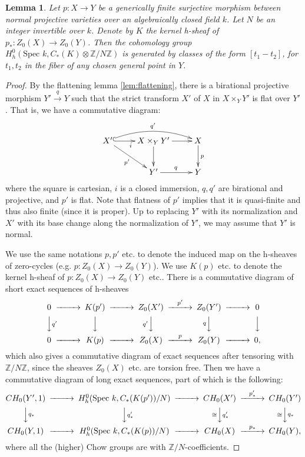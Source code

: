 \documentclass{amsart}
\newtheorem{lem}[theorem]{Lemma}
\theoremstyle{definition}
\theoremstyle{remark}
\newcommand{\mbb}{\mathbb}
\newcommand{\ZZ}{\mbb{Z}}
\newcommand{\SP}{\text{Spec }}
\begin{document}
\begin{lem}\label{lem:move}
Let $p: X \to Y$ be a generically finite surjective morphism between normal projective varieties over an algebraically closed field $k$.
 Let $N$ be an integer invertible over $k$.
Denote by $K$ the kernel h-sheaf of $p_*: Z_0(X) \to Z_0(Y)$.
Then the cohomology group $H_h^{0}(\SP k, C_*(K)\otimes \ZZ/N\ZZ)$ is generated by classes of the form $[t_1-t_2]$, for $t_1, t_2$ in the fiber of any chosen general point in $Y$.
\end{lem}
\begin{proof}
By the flattening lemma \ref{lem:flattening}, there is a birational projective  morphism $Y' \xrightarrow{q} Y$ such that the strict transform $X'$ of $X$ in $X \times_Y Y'$ is flat over $Y'$. That is, we have a commutative diagram:
\[
\xymatrix{
X' \ar[rd]_{p'} \ar@{^{(}->}[r]_i \ar@/^1pc/[rr]^{q'}
&X\times_Y Y' \ar[d]\ar[r]
&X \ar[d]^p\\
&Y' \ar[r]^q &Y
}
\]
where the square is cartesian, $i$ is a closed immersion, $q, q'$ are birational and projective, and $p'$ is flat.
Note that flatness of $p'$ implies that it is quasi-finite and thus also finite (since it is proper).
Up to replacing $Y'$ with its normalization and $X'$ with its base change along the normalization of $Y'$, we may assume that $Y'$ is normal.

We use the same notations $p, p'$ etc. to denote the induced map on the h-sheaves of zero-cycles (e.g. $p:Z_0(X) \to Z_0(Y)$).
We use $K(p)$ etc. to denote the kernel h-sheaf of $p: Z_0(X) \to Z_0(Y)$ etc.. 
There is a commutative diagram of short exact sequences of h-sheaves
\[
\begin{CD}
0 @>>> K(p') @>>> Z_0(X') @>p'>> Z_0(Y') @>>> 0\\
@VVq'V @VVV @Vq'VV @VqVV @VVV\\
0 @>>> K(p) @>>> Z_0(X) @>p>> Z_0(Y) @>>> 0,
\end{CD}
\]
which also gives a commutative diagram of exact sequences after tensoring with $\ZZ/N\ZZ$, since the sheaves $Z_0(X)$ etc. are torsion free.
Then we have a commutative diagram of long exact sequences, part of which is the following:
\[
\begin{CD}
     CH_0(Y', 1) @>>> H_h^{0}(\SP k, C_*(K(p'))/N)
    @>>> CH_0(X')  @>p_*'>> CH_0(Y')\\
    @VVq_* V @VVq_*' V @V\cong Vq_*'V @V\cong Vq_* V\\
     CH_0(Y, 1) @>>> H_h^{0}(\SP k, C_*(K(p))/N)
    @>>>CH_0(X)  @>p_*>> CH_0(Y),
\end{CD}
\]
where all the (higher) Chow groups are
with $\ZZ/N$-coefficients.


\end{proof}
\end{document}
